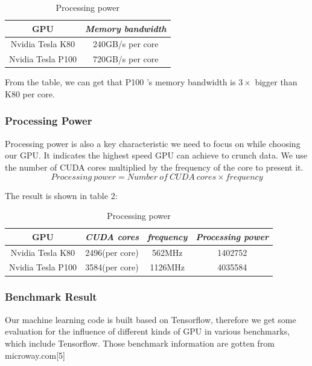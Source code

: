 \documentclass[conference]{IEEEtran}
\begin{document}
\begin{table}[htbp]
\caption{Processing power}
\begin{center}
\begin{tabular}{|c|c|}
\hline
\textbf{GPU} & \textbf{\textit{Memory bandwidth}}\\
\hline
Nvidia Tesla K80 & 240GB/s per core \\
\hline
Nvidia Tesla P100 & 720GB/s per core\\
\hline
\end{tabular}
\label{tab1}
\end{center}
\end{table}


From the table, we can get that P100 's memory bandwidth is $3 \times$ bigger than K80 per core. 

\subsubsection{Processing Power}
Processing power is also a key characteristic we need to focus on while choosing our GPU. It indicates the highest speed GPU can achieve to crunch data. We use the number of CUDA cores multiplied by the frequency of the core to present it.
$$Processing \ power = Number \ of \ CUDA \ cores \times frequency $$

The result is shown in table 2:

\begin{table}[htbp]
\caption{Processing power}
\begin{center}
\begin{tabular}{|c|c|c|c|}
\hline
\textbf{GPU} & \textbf{\textit{CUDA cores}}& \textbf{\textit{frequency}}& \textbf{\textit{Processing power}} \\
\hline
Nvidia Tesla K80 & 2496(per core)& 562MHz & 1402752 \\
\hline
Nvidia Tesla P100 & 3584(per core)& 1126MHz & 4035584 \\
\hline
\end{tabular}
\label{tab2}
\end{center}
\end{table}

\subsubsection{Benchmark Result}

Our machine learning code is built based on Tensorflow, therefore we get some evaluation for the influence of different kinds of GPU in various benchmarks, which include Tensorflow. Those benchmark information are gotten from microway.com[5]
\end{document}
